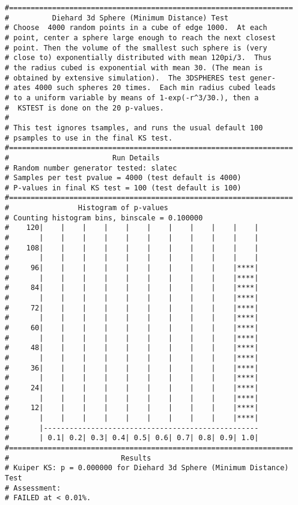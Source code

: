 \documentclass{book}
\begin{document}
{\begin{verbatim}
#==================================================================
#          Diehard 3d Sphere (Minimum Distance) Test
# Choose  4000 random points in a cube of edge 1000.  At each   
# point, center a sphere large enough to reach the next closest 
# point. Then the volume of the smallest such sphere is (very   
# close to) exponentially distributed with mean 120pi/3.  Thus  
# the radius cubed is exponential with mean 30. (The mean is    
# obtained by extensive simulation).  The 3DSPHERES test gener- 
# ates 4000 such spheres 20 times.  Each min radius cubed leads 
# to a uniform variable by means of 1-exp(-r^3/30.), then a     
#  KSTEST is done on the 20 p-values.                           
#
# This test ignores tsamples, and runs the usual default 100
# psamples to use in the final KS test.
#==================================================================
#                        Run Details
# Random number generator tested: slatec
# Samples per test pvalue = 4000 (test default is 4000)
# P-values in final KS test = 100 (test default is 100)
#==================================================================
#                Histogram of p-values
# Counting histogram bins, binscale = 0.100000
#    120|    |    |    |    |    |    |    |    |    |    |
#       |    |    |    |    |    |    |    |    |    |    |
#    108|    |    |    |    |    |    |    |    |    |    |
#       |    |    |    |    |    |    |    |    |    |    |
#     96|    |    |    |    |    |    |    |    |    |****|
#       |    |    |    |    |    |    |    |    |    |****|
#     84|    |    |    |    |    |    |    |    |    |****|
#       |    |    |    |    |    |    |    |    |    |****|
#     72|    |    |    |    |    |    |    |    |    |****|
#       |    |    |    |    |    |    |    |    |    |****|
#     60|    |    |    |    |    |    |    |    |    |****|
#       |    |    |    |    |    |    |    |    |    |****|
#     48|    |    |    |    |    |    |    |    |    |****|
#       |    |    |    |    |    |    |    |    |    |****|
#     36|    |    |    |    |    |    |    |    |    |****|
#       |    |    |    |    |    |    |    |    |    |****|
#     24|    |    |    |    |    |    |    |    |    |****|
#       |    |    |    |    |    |    |    |    |    |****|
#     12|    |    |    |    |    |    |    |    |    |****|
#       |    |    |    |    |    |    |    |    |    |****|
#       |--------------------------------------------------
#       | 0.1| 0.2| 0.3| 0.4| 0.5| 0.6| 0.7| 0.8| 0.9| 1.0|
#==================================================================
#                          Results
# Kuiper KS: p = 0.000000 for Diehard 3d Sphere (Minimum Distance) Test
# Assessment:
# FAILED at < 0.01%.


\end{verbatim}}
\end{document}
